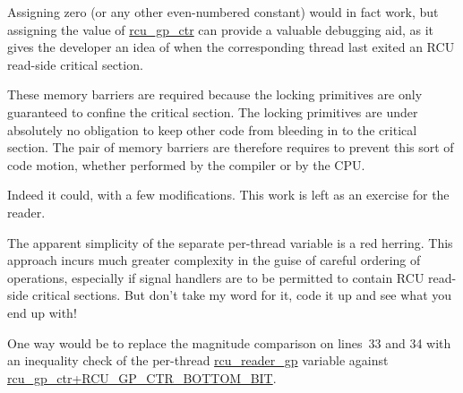	Assigning zero (or any other even-numbered constant)
	would in fact work, but assigning the value of
	\url{rcu_gp_ctr} can provide a valuable debugging aid,
	as it gives the developer an idea of when the corresponding
	thread last exited an RCU read-side critical section.


	These memory barriers are required because the locking
	primitives are only guaranteed to confine the critical
	section.
	The locking primitives are under absolutely no obligation
	to keep other code from bleeding in to the critical section.
	The pair of memory barriers are therefore requires to prevent
	this sort of code motion, whether performed by the compiler
	or by the CPU.


	Indeed it could, with a few modifications.
	This work is left as an exercise for the reader.


	The apparent simplicity of the separate per-thread variable
	is a red herring.
	This approach incurs much greater complexity in the guise
	of careful ordering of operations, especially if signal
	handlers are to be permitted to contain RCU read-side
	critical sections.
	But don't take my word for it, code it up and see what you
	end up with!


	One way would be to replace the magnitude comparison on
	lines~33 and 34 with an inequality check of the per-thread
	\url{rcu_reader_gp} variable against
	\url{rcu_gp_ctr+RCU_GP_CTR_BOTTOM_BIT}.


